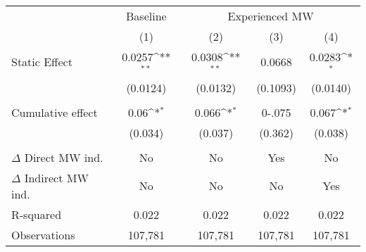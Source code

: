 {
\def\sym#1{\ifmmode^{#1}\else\(^{#1}\)\fi}
\begin{tabular}{l*{4}{c}}
\hline\hline
          &\multicolumn{1}{c}{Baseline}&\multicolumn{3}{c}{Experienced MW}                      \\\cmidrule(lr){2-2}\cmidrule(lr){3-5}
          &\multicolumn{1}{c}{(1)}         &\multicolumn{1}{c}{(2)}         &\multicolumn{1}{c}{(3)}         &\multicolumn{1}{c}{(4)}         \\
\hline
Static Effect&   0.0257\sym{**} &   0.0308\sym{**} &   0.0668         &   0.0283\sym{*}  \\
          & (0.0124)         & (0.0132)         & (0.1093)         & (0.0140)         \\
\hline
\vspace{-1mm}&                  &                  &                  &                  \\
Cumulative effect&0.06\sym{*}         &0.066\sym{*}         &   0-.075         &0.067\sym{*}         \\
          &  (0.034)         &  (0.037)         &  (0.362)         &  (0.038)         \\
\hline    &                  &                  &                  &                  \\
$\Delta$ Direct MW ind.&       No         &       No         &      Yes         &       No         \\
$\Delta$ Indirect MW ind.&       No         &       No         &       No         &      Yes         \\
R-squared &    0.022         &    0.022         &    0.022         &    0.022         \\
Observations&  107,781         &  107,781         &  107,781         &  107,781         \\
\hline\hline
\end{tabular}
}
